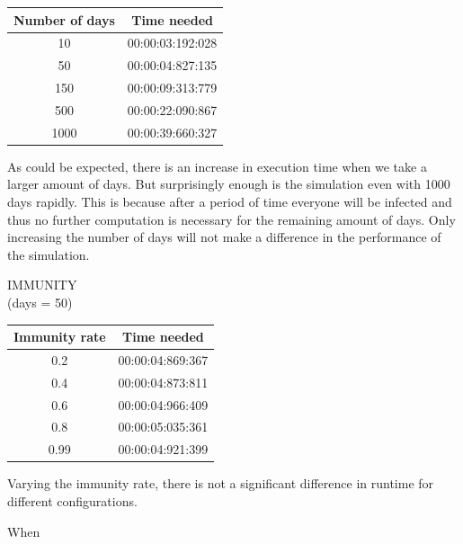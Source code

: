 \documentclass[runningheads]{llncs}
\begin{document}
\begin{center}
	\begin{tabular}{ | c | c |}
	\hline
	Number of days & Time needed \\ \hline
	10 & 00:00:03:192:028 \\ \hline
	50 & 00:00:04:827:135 \\ \hline
	150 & 00:00:09:313:779 \\ \hline
	500 & 00:00:22:090:867 \\ \hline
	1000 & 00:00:39:660:327 \\
	\hline	
	\end{tabular}
\end{center}

As could be expected, there is an increase in execution time when we take a larger amount of days. But surprisingly enough is the simulation even with 1000 days rapidly. This is because after a period of time everyone will be infected and thus no further computation is necessary for the remaining amount of days. Only increasing the number of days will not make a difference in the performance of the simulation.

IMMUNITY\\
(days = 50)
\begin{center}
	\begin{tabular}{ | c | c |}
		\hline
		Immunity rate & Time needed \\ \hline
		0.2 & 00:00:04:869:367 \\ \hline
		0.4 & 00:00:04:873:811 \\ \hline
		0.6 & 00:00:04:966:409 \\ \hline
		0.8 & 00:00:05:035:361 \\ \hline
		0.99 & 00:00:04:921:399 \\
		\hline	
	\end{tabular}
\end{center} 

Varying the immunity rate, there is not a significant difference in runtime for different configurations.

When
\end{document}
